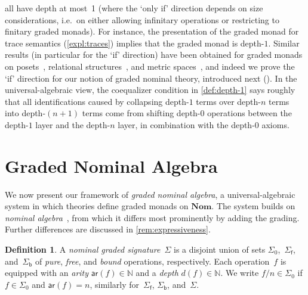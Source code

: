 \documentclass[11pt,a4paper]{amsart}
\newcommand{\sigp}{\Sigma_0}
\newcommand{\sigf}{\Sigma_{\mathsf f}}
\newcommand{\sigb}{\Sigma_{\mathsf b}}
\newcommand{\ar}{\mathsf{ar}}
\theoremstyle{plain}
\numberwithin{equation}{section}
\newcommand{\Nat}{{\mathbb{N}}}
\newcommand{\+}[1]{\mathcal{#1}\xspace}
\newcommand{\Nom}{\mathbf{Nom}}
\theoremstyle{definition}
\newtheorem{defn}[defn]{Definition}
\begin{document}
all have depth at most~1 \cite[Proposition~7.3]{MiliusEA15} (where the
`only if' direction depends on size considerations, i.e.~on either
allowing infinitary operations or restricting to finitary graded
monads). For instance, the presentation of the graded monad for trace
semantics (\cref{expl:traces}) implies that the graded monad is
depth-$1$. Similar results (in particular for the `if' direction) have
been obtained for graded monads on posets~\cite{FordEA21}, relational
structures~\cite{FordThesis}, and metric spaces~\cite{ForsterEA25a},
and indeed we prove the `if' direction for our notion of graded
nominal theory, introduced next (). In the
universal-algebraic view, the coequalizer condition in
\cref{def:depth-1} says roughly that all identifications caused by
collapsing depth-$1$ terms over depth-$n$ terms into depth-$(n+1)$
terms come from shifting depth-$0$ operations between the depth-$1$
layer and the depth-$n$ layer, in combination with the depth-$0$
axioms.


\section{Graded Nominal Algebra}\label{sec:graded-algebra}

\noindent We now present our framework of \emph{graded nominal
  algebra}, a universal-algebraic system in which theories define
graded monads on $\Nom$. The system builds on \emph{nominal
  algebra}~\cite{Gabbay09,GabbayMathijssen09}, from which it differs
most prominently by adding the grading.  Further differences are
discussed in \cref{rem:expressiveness}.

\begin{defn}
  A \emph{nominal graded signature}~\(\Sigma\) is a disjoint union of
  sets $\sigp$,~$\sigf$, and~$\sigb$ of \emph{pure}, \emph{free}, and
  \emph{bound} operations, respectively. Each operation~$f$ is
  equipped with an \emph{arity} \(\ar(f) \in \Nat\) and a \emph{depth}
  \(d(f) \in \Nat\).  We write \(f/n \in \sigp\) if \(f \in \sigp\)
  and \(\ar(f) = n\), similarly for~\(\sigf\), \(\sigb\),
  and~$\Sigma$.
\end{defn}
\end{document}
